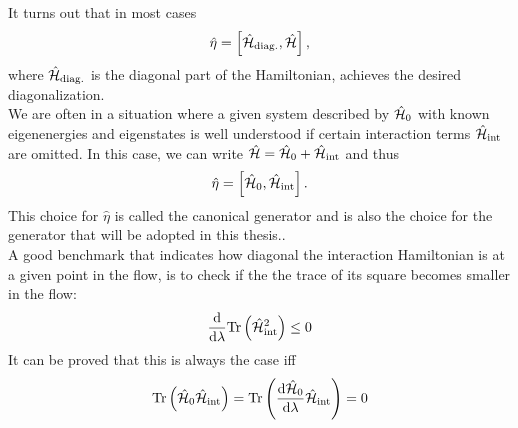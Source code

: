It turns out that in most cases 
\begin{equation}\label{FEQ_eta_def}
\hat\eta = \left[\hat{\mathcal{H}}_{\mathrm{diag.}},\hat{\mathcal{H}} \right],
\end{equation}
where $\hat{\mathcal{H}}_{\mathrm{diag.}}$ is the diagonal part of the Hamiltonian, achieves the desired diagonalization.  \\
We are often in a situation where a given system described by $\hat{\mathcal{H}}_0$ with known eigenenergies  and eigenstates is well understood if certain interaction terms $\hat{\mathcal{H}}_{\mathrm{int}}$ are omitted. In this case, we can write $\hat{\mathcal{H}} = \hat{\mathcal{H}}_0 + \hat{\mathcal{H}}_{\mathrm{int}}$ and thus
\begin{equation}\label{FEQ_can_eta_def}
\hat\eta = \left[\hat{\mathcal{H}}_0, \hat{\mathcal{H}}_{\mathrm{int}}\right].
\end{equation}
This choice for $\hat \eta$ is called the canonical generator and is also the choice for the generator that will be adopted in this thesis.. \\
A good benchmark that indicates how diagonal the interaction Hamiltonian is at a given point in the flow, is to check if the the trace of its square becomes smaller in the flow:
\begin{equation}\label{check_trace}
\frac{\mathrm d}{\mathrm d \lambda}\mathrm{Tr}\left(\hat{\mathcal{H}}^2_{\mathrm{int}}\right)\leq 0
\end{equation}
It can be proved \cite[pp. 27-28]{kehrein2006flow} that this is always the case iff 
\begin{align}\label{useless_check}
\mathrm{Tr}\left(\hat{\mathcal{H}}_0\hat{\mathcal{H}}_{\mathrm{int}}\right)=\mathrm{Tr}\left(\frac{\mathrm d\hat{\mathcal{H}}_0}{\mathrm d\lambda} \hat{\mathcal{H}}_{\mathrm{int}}\right)=0
\end{align}
